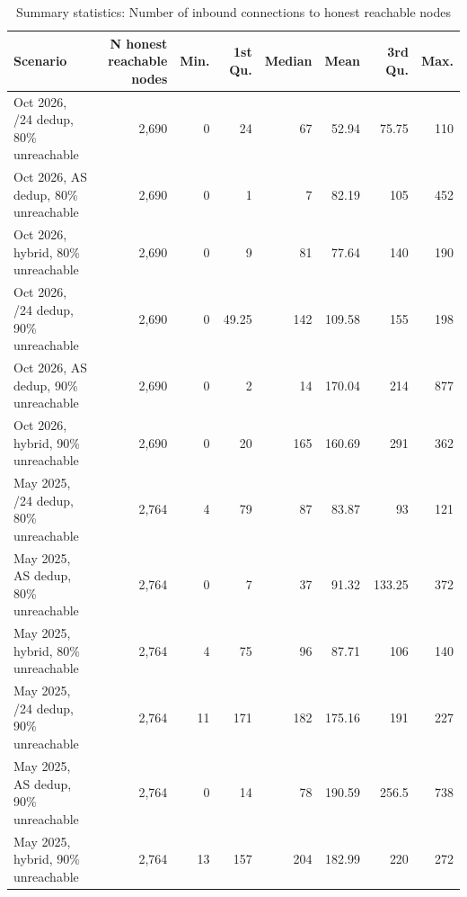 \begin{table}[t]
\caption{
{\fontsize{20}{25}\selectfont  Summary statistics: Number of inbound connections to honest reachable nodes}
} 
\begin{tabular*}{\linewidth}{@{\extracolsep{\fill}}lrrrrrrr}
\toprule
Scenario & N honest reachable nodes & Min. & 1st Qu. & Median & Mean & 3rd Qu. & Max. \\ 
\midrule\addlinespace[2.5pt]
Oct 2026, /24 dedup, 80\% unreachable & 2,690 & 0 & 24 & 67 & 52.94 & 75.75 & 110 \\ 
Oct 2026, AS dedup, 80\% unreachable & 2,690 & 0 & 1 & 7 & 82.19 & 105 & 452 \\ 
Oct 2026, hybrid, 80\% unreachable & 2,690 & 0 & 9 & 81 & 77.64 & 140 & 190 \\ 
Oct 2026, /24 dedup, 90\% unreachable & 2,690 & 0 & 49.25 & 142 & 109.58 & 155 & 198 \\ 
Oct 2026, AS dedup, 90\% unreachable & 2,690 & 0 & 2 & 14 & 170.04 & 214 & 877 \\ 
Oct 2026, hybrid, 90\% unreachable & 2,690 & 0 & 20 & 165 & 160.69 & 291 & 362 \\ 
May 2025, /24 dedup, 80\% unreachable & 2,764 & 4 & 79 & 87 & 83.87 & 93 & 121 \\ 
May 2025, AS dedup, 80\% unreachable & 2,764 & 0 & 7 & 37 & 91.32 & 133.25 & 372 \\ 
May 2025, hybrid, 80\% unreachable & 2,764 & 4 & 75 & 96 & 87.71 & 106 & 140 \\ 
May 2025, /24 dedup, 90\% unreachable & 2,764 & 11 & 171 & 182 & 175.16 & 191 & 227 \\ 
May 2025, AS dedup, 90\% unreachable & 2,764 & 0 & 14 & 78 & 190.59 & 256.5 & 738 \\ 
May 2025, hybrid, 90\% unreachable & 2,764 & 13 & 157 & 204 & 182.99 & 220 & 272 \\ 
\bottomrule
\end{tabular*}
\label{table-inbound-summary}
\end{table}
